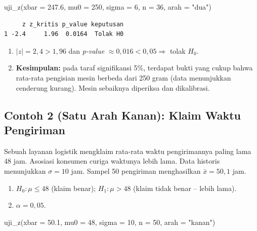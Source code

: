 \documentclass[
  indonesian,
  letterpaper,
]{book}
\newenvironment{Shaded}{\begin{snugshade}}{\end{snugshade}}
\newcommand{\AttributeTok}[1]{\textcolor[rgb]{0.40,0.45,0.13}{#1}}
\newcommand{\DecValTok}[1]{\textcolor[rgb]{0.68,0.00,0.00}{#1}}
\newcommand{\FloatTok}[1]{\textcolor[rgb]{0.68,0.00,0.00}{#1}}
\newcommand{\FunctionTok}[1]{\textcolor[rgb]{0.28,0.35,0.67}{#1}}
\newcommand{\NormalTok}[1]{\textcolor[rgb]{0.00,0.23,0.31}{#1}}
\newcommand{\StringTok}[1]{\textcolor[rgb]{0.13,0.47,0.30}{#1}}
\providecommand{\tightlist}{%
  \setlength{\itemsep}{0pt}\setlength{\parskip}{0pt}}
\begin{document}
\begin{Shaded}
\begin{Highlighting}[]
\FunctionTok{uji\_z}\NormalTok{(}\AttributeTok{xbar =} \FloatTok{247.6}\NormalTok{, }\AttributeTok{mu0 =} \DecValTok{250}\NormalTok{, }\AttributeTok{sigma =} \DecValTok{6}\NormalTok{, }\AttributeTok{n =} \DecValTok{36}\NormalTok{, }\AttributeTok{arah =} \StringTok{"dua"}\NormalTok{)}
\end{Highlighting}
\end{Shaded}

\begin{verbatim}
     z z_kritis p_value keputusan
1 -2.4     1.96  0.0164  Tolak H0
\end{verbatim}

\begin{enumerate}
\def\labelenumi{\arabic{enumi}.}
\setcounter{enumi}{3}
\tightlist
\item
  \(\lvert z \rvert = 2{,}4 > 1{,}96\) dan \emph{p-value}
  \(\approx 0{,}016 < 0{,}05 \Rightarrow\) tolak \(H_0\).
\item
  \textbf{Kesimpulan:} pada taraf signifikansi 5\%, terdapat bukti yang
  cukup bahwa rata-rata pengisian mesin berbeda dari 250 gram (data
  menunjukkan cenderung kurang). Mesin sebaiknya diperiksa dan
  dikalibrasi.
\end{enumerate}

\subsection{Contoh 2 (Satu Arah Kanan): Klaim Waktu
Pengiriman}\label{contoh-2-satu-arah-kanan-klaim-waktu-pengiriman}

Sebuah layanan logistik mengklaim rata-rata waktu pengirimannya paling
lama 48 jam. Asosiasi konsumen curiga waktunya lebih lama. Data historis
menunjukkan \(\sigma = 10\) jam. Sampel 50 pengiriman menghasilkan
\(\bar{x} = 50{,}1\) jam.

\begin{enumerate}
\def\labelenumi{\arabic{enumi}.}
\tightlist
\item
  \(H_0: \mu \le 48\) (klaim benar); \(H_1: \mu > 48\) (klaim tidak
  benar -- lebih lama).
\item
  \(\alpha = 0{,}05\).
\end{enumerate}

\begin{Shaded}
\begin{Highlighting}[]
\FunctionTok{uji\_z}\NormalTok{(}\AttributeTok{xbar =} \FloatTok{50.1}\NormalTok{, }\AttributeTok{mu0 =} \DecValTok{48}\NormalTok{, }\AttributeTok{sigma =} \DecValTok{10}\NormalTok{, }\AttributeTok{n =} \DecValTok{50}\NormalTok{, }\AttributeTok{arah =} \StringTok{"kanan"}\NormalTok{)}
\end{Highlighting}
\end{Shaded}
\end{document}
